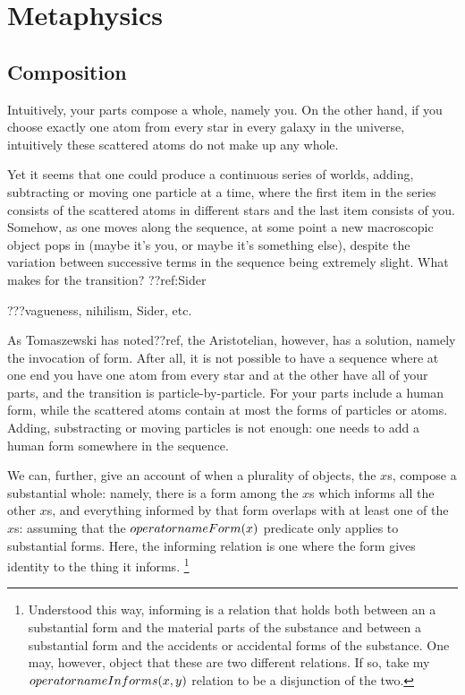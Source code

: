 \def\mychapter{VIII}

\chapter{Metaphysics}\label{ch:metaphysics}
\section{Composition}
Intuitively, your parts compose a whole, namely you. On the other hand,
if you choose exactly one atom from every star in every galaxy in the universe,
intuitively these scattered atoms do not make up any whole.

Yet it seems that one could produce a continuous series of worlds, adding, subtracting or moving 
one particle at a time, where the first item in the series consists of the scattered
atoms in different stars and the last item consists of you. Somehow, as one moves
along the sequence, at some point a new macroscopic object pops in (maybe it's 
you, or maybe it's something else), despite the variation between successive terms
in the sequence being extremely slight. What makes for the transition? ??ref:Sider

???vagueness, nihilism, Sider, etc.

As Tomaszewski has noted??ref, the Aristotelian, however, has a solution, namely
the invocation of form. After all, it is not possible to have a sequence where at
one end you have one atom from every star and at the other have all of your parts,
and the transition is particle-by-particle. For your parts include a human form,
while the scattered atoms contain at most the forms of particles or atoms. Adding,
substracting or moving particles is not enough: one needs to add a human form
somewhere in the sequence.

We can, further, give an account of when a plurality of objects, the $x$s, compose a 
substantial whole: namely, there is a form among the $x$s which informs all the other $x$s, 
and everything informed by that form overlaps with at least one of the $x$s:
assuming that the $operatorname{Form}(x)$ predicate only applies to substantial forms.
Here, the informing relation is one where the form gives identity to the thing it informs.
\footnote{Understood this way, informing is a relation that holds both between an a substantial 
form and the material parts of the substance and between a substantial form and the accidents or 
accidental forms of the substance. One may, however, object that these are two different relations.
If so, take my $operatorname{Informs}(x,y)$ relation to be a disjunction of the two.}

